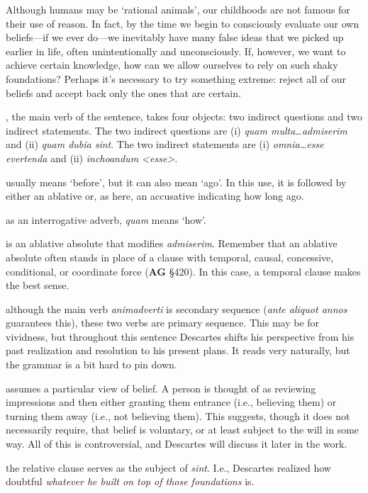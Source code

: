 \prenotes

Although humans may be `rational animals', our childhoods are not famous for their use of reason. In fact, by the time we begin to consciously evaluate our own beliefs---if we ever do---we inevitably have many false ideas that we picked up earlier in life, often unintentionally and unconsciously. If, however, we want to achieve certain knowledge, how can we allow ourselves to rely on such shaky foundations? Perhaps it's necessary to try something extreme: reject all of our beliefs and accept back only the ones that are certain.

, the main verb of the sentence, takes four objects: two indirect questions and two indirect statements. The two indirect questions are (i) \textit{quam multa\dots admiserim} and (ii) \textit{quam dubia sint}. The two indirect statements are (i) \textit{omnia\dots esse evertenda} and (ii) \textit{inchoandum <esse>}.

 usually means `before', but it can also mean `ago'. In this use, it is followed by either an ablative or, as here, an accusative indicating how long ago.

 as an interrogative adverb, \textit{quam} means `how'.

 is an ablative absolute that modifies \textit{admiserim}. Remember that an ablative absolute often stands in place of a clause with temporal, causal, concessive, conditional, or coordinate force (\textbf{AG} §420). In this case, a temporal clause makes the best sense.

 although the main verb \textit{animadverti} is secondary sequence (\textit{ante aliquot annos} guarantees this), these two verbs are primary sequence. This may be for vividness, but throughout this sentence Descartes shifts his perspective from his past realization and resolution to his present plans. It reads very naturally, but the grammar is a bit hard to pin down.

 assumes a particular view of belief. A person is thought of as reviewing impressions and then either granting them entrance (i.e., believing them) or turning them away (i.e., not believing them). This suggests, though it does not necessarily require, that belief is voluntary, or at least subject to the will in some way. All of this is controversial, and Descartes will discuss it later in the work.

 the relative clause serves as the subject of \textit{sint}. I.e., Descartes realized how doubtful \textit{whatever he built on top of those foundations} is.

